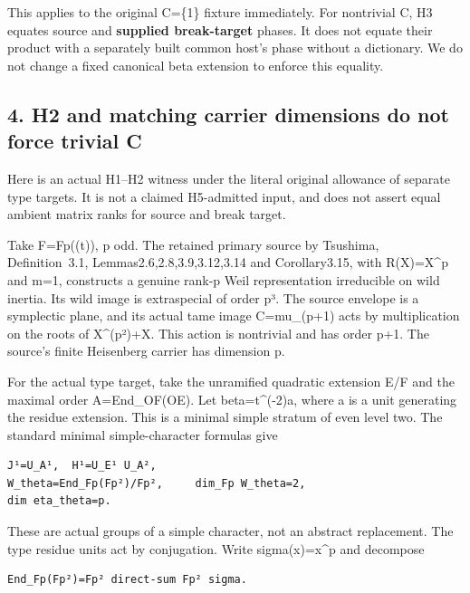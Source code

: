 This applies to the original C=\{1\} fixture immediately. For nontrivial
C, H3 equates source and \textbf{supplied break-target} phases. It does
not equate their product with a separately built common host's phase
without a dictionary. We do not change a fixed canonical beta extension
to enforce this equality.

\hypertarget{stabilizer_contract-h2-and-matching-carrier-dimensions-do-not-force-trivial-c}{%
\subsection{4. H2 and matching carrier dimensions do not force trivial
C}\label{stabilizer_contract-h2-and-matching-carrier-dimensions-do-not-force-trivial-c}}

Here is an actual H1--H2 witness under the literal original allowance of
separate type targets. It is not a claimed H5-admitted input, and does
not assert equal ambient matrix ranks for source and break target.

Take F=Fp((t)), p odd. The retained primary source by Tsushima,
Definition~3.1, Lemmas2.6,2.8,3.9,3.12,3.14 and Corollary3.15, with
R(X)=X\^{}p and m=1, constructs a genuine rank-p Weil representation
irreducible on wild inertia. Its wild image is extraspecial of order p³.
The source envelope is a symplectic plane, and its actual tame image
C=mu\_(p+1) acts by multiplication on the roots of X\^{}(p²)+X. This
action is nontrivial and has order p+1. The source's finite Heisenberg
carrier has dimension p.

For the actual type target, take the unramified quadratic extension E/F
and the maximal order A=End\_OF(OE). Let beta=t\^{}(-2)a, where a is a
unit generating the residue extension. This is a minimal simple stratum
of even level two. The standard minimal simple-character formulas give

\begin{Verbatim}[fontsize=\small,breaklines=true,breakanywhere=true]
J¹=U_A¹,  H¹=U_E¹ U_A²,
W_theta=End_Fp(Fp²)/Fp²,     dim_Fp W_theta=2,
dim eta_theta=p.
\end{Verbatim}

These are actual groups of a simple character, not an abstract
replacement. The type residue units act by conjugation. Write
sigma(x)=x\^{}p and decompose

\begin{Verbatim}[fontsize=\small,breaklines=true,breakanywhere=true]
End_Fp(Fp²)=Fp² direct-sum Fp² sigma.
\end{Verbatim}

